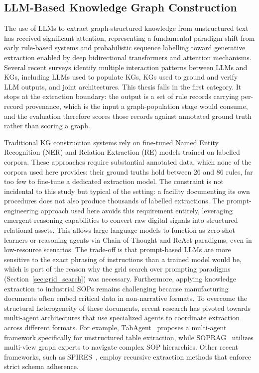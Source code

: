 \documentclass[11pt]{article}
\begin{document}
\subsection{LLM-Based Knowledge Graph Construction}
\label{sec:rw_kgllm}

The use of LLMs to extract graph-structured knowledge from unstructured text has
received significant attention, representing a fundamental paradigm shift from early rule-based systems and probabilistic sequence labelling toward generative extraction enabled by deep bidirectional transformers and attention mechanisms.
Several recent surveys identify multiple interaction patterns between LLMs and
KGs, including LLMs used to populate KGs, KGs used to ground and verify LLM
outputs, and joint architectures.
This thesis falls in the first category. It stops at the extraction boundary:
the output is a set of rule records carrying per-record provenance, which is the
input a graph-population stage would consume, and the evaluation therefore scores
those records against annotated ground truth rather than scoring a graph.

Traditional KG construction systems rely on fine-tuned Named Entity Recognition
(NER) and Relation Extraction (RE) models trained on labelled corpora.
These approaches require substantial annotated data, which none of the corpora
used here provides: their ground truths hold between 26 and 86 rules, far too few
to fine-tune a dedicated extraction model. The constraint is not incidental to
this study but typical of the setting: a facility documenting its own
procedures does not also produce thousands of labelled extractions.
The prompt-engineering approach used here avoids this requirement entirely, leveraging emergent reasoning capabilities to convert raw digital signals into structured relational assets. This allows large language models to function as zero-shot learners or reasoning agents via Chain-of-Thought and ReAct paradigms, even in low-resource scenarios.
The trade-off is that prompt-based LLMs are more sensitive to the exact phrasing
of instructions than a trained model would be, which is part of the reason why
the grid search over prompting paradigms (Section~\ref{sec:grid_search}) was
necessary.
Furthermore, applying knowledge extraction to industrial SOPs remains challenging because manufacturing documents often embed critical data in non-narrative formats. To overcome the structural heterogeneity of these documents, recent research has pivoted towards multi-agent architectures that use specialized agents to coordinate extraction across different formats. For example, TabAgent~\cite{wu2025tabagent} proposes a multi-agent framework specifically for unstructured table extraction, while SOPRAG~\cite{lin2026soprag} utilizes multi-view graph experts to navigate complex SOP hierarchies. Other recent frameworks, such as SPIRES~\cite{caufield2024spires}, employ recursive extraction methods that enforce strict schema adherence.
\end{document}
